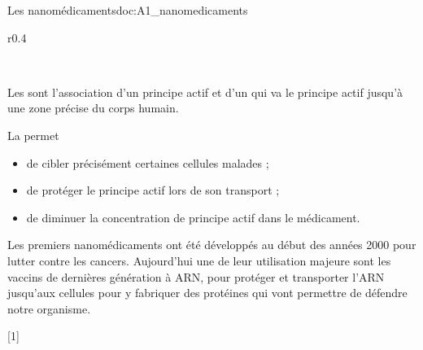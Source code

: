 \begin{doc}{Les nanomédicaments}{doc:A1_nanomedicaments}
  \begin{wrapfigure}[6]{r}{0.4\linewidth}
    \vspace*{-10pt}
    \begin{center}
       \\
    \end{center}
  \end{wrapfigure}

  Les  sont l'association d'un principe actif et d'un  qui va  le principe actif jusqu'à une zone précise du corps humain.

  \begin{importants}
    La  permet
    \begin{itemize}[label=\pointCyan, leftmargin=*]
      \item de cibler précisément certaines cellules malades ;
      \item de protéger le principe actif lors de son transport ;
      \item de diminuer la concentration de principe actif dans le médicament.
    \end{itemize}
  \end{importants}

  Les premiers nanomédicaments ont été développés au début des années 2000 pour lutter contre les cancers.
  Aujourd'hui une de leur utilisation majeure sont les vaccins de dernières génération à ARN, pour protéger et transporter l'ARN jusqu'aux cellules pour y fabriquer des protéines qui vont permettre de défendre notre organisme.
\end{doc}

[1]